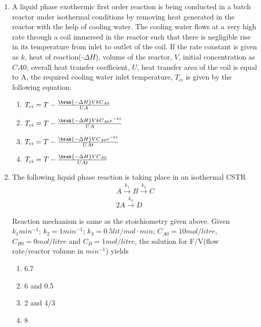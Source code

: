 \documentclass[journal,12pt,onecolumn]{IEEEtran}
\theoremstyle{remark}
\begin{document}
\begin{enumerate}
 \item A liquid phase exothermic first order reaction is being conducted in a batch reactor under isothermal conditions by removing heat generated in the reactor with the help of cooling water. The cooling water flows at a very high rate through a coil immersed in the reactor such that there is negligible rise in its temperature from inlet to outlet of the coil. If the rate constant is given as $k$, heat of reaction(-$\Delta H$), volume of the reactor, $V$, initial concentration as $C_{}A0$, overall heat transfer coefficient, $U$, heat transfer area of the coil is equal to A, the required cooling water inlet temperature, $T_{ci}$ is given by the following equation:

 \begin{enumerate}
     \item $T_{ci}=T-\frac{\brak{-\Delta H}VkC_{A0}}{UA}$
      \item $T_{ci}=T-\frac{\brak{-\Delta H}VkC_{A0}e^{-kt}}{UA}$
       \item $T_{ci}=T-\frac{\brak{-\Delta H}VC_{A0}e^{-kt}}{UAt}$
        \item $T_{ci}=T-\frac{\brak{-\Delta H}VC_{A0}}{UAt}$
 \end{enumerate}

    \item The following liquid phase reaction is taking place in an isothermal CSTR
    \begin{align*}
        A\xrightarrow{k_1}B\xrightarrow{k_2}C \\
        2A\xrightarrow{k_3}D
    \end{align*}

Reaction mechanism is same as the stoichiometry given above. Given $k_1 min^{-1}$; $k_2=1min^{-1}$; $k_3=0.5 lit/mol\cdot min$; $C_{A0}=10mol/litre$, $C_{B0}=0mol/litre$ and $C_B=1mol/litre$, the solution for F/V(flow rate/reactor volume in $min^{-1}$) yields

\begin{multicols}{4}
    \begin{enumerate}
        \item 6.7
        \item 6 and 0.5
        \item 2 and 4/3
        \item 8
    \end{enumerate}
\end{multicols}
    

\end{enumerate}
\end{document}
